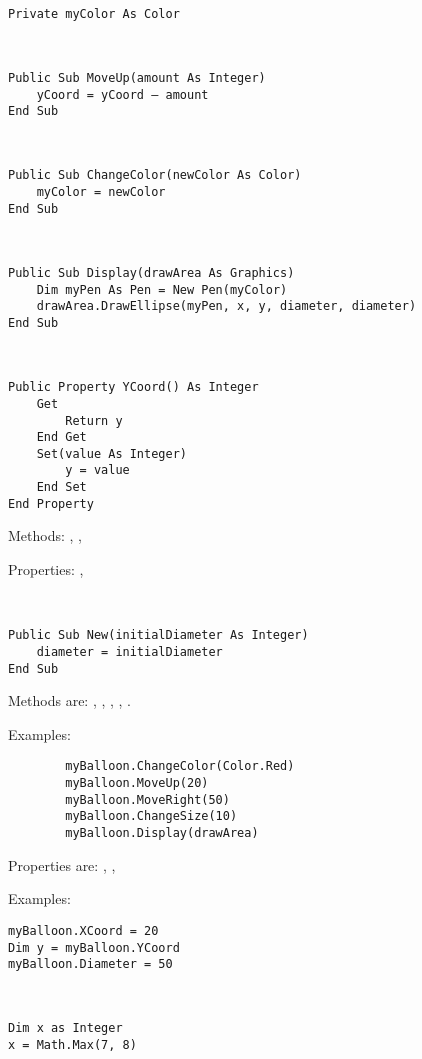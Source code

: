 		\begin{stab}
			\begin{enumChapter}
				\item \ \begin{lstlisting}
Private myColor As Color
					\end{lstlisting}	
				\item \	\begin{lstlisting}
Public Sub MoveUp(amount As Integer)
	yCoord = yCoord – amount
End Sub
					\end{lstlisting}
				\item \ \begin{lstlisting}
Public Sub ChangeColor(newColor As Color)
	myColor = newColor
End Sub
					\end{lstlisting}
				\item \ \begin{lstlisting}
Public Sub Display(drawArea As Graphics)
	Dim myPen As Pen = New Pen(myColor)
	drawArea.DrawEllipse(myPen, x, y, diameter, diameter)
End Sub
					\end{lstlisting}
				\item \ \begin{lstlisting}
Public Property YCoord() As Integer
	Get
		Return y
	End Get
	Set(value As Integer)
		y = value
	End Set
End Property
					\end{lstlisting}
				\item	Methods: , , 
				
					Properties: , 
				\item \ \begin{lstlisting}
Public Sub New(initialDiameter As Integer)
	diameter = initialDiameter
End Sub
					\end{lstlisting}
				\item	Methods are: , , , , .
					
					Examples:
					\begin{lstlisting}
		myBalloon.ChangeColor(Color.Red)
		myBalloon.MoveUp(20)
		myBalloon.MoveRight(50)
		myBalloon.ChangeSize(10)
		myBalloon.Display(drawArea)
					\end{lstlisting}
					Properties are: , , 
					
					Examples:
					\begin{lstlisting}
myBalloon.XCoord = 20
Dim y = myBalloon.YCoord
myBalloon.Diameter = 50
					\end{lstlisting}
					\item \
					\begin{lstlisting}
Dim x as Integer
x = Math.Max(7, 8)
					\end{lstlisting}
			\end{enumChapter}
		\end{stab}
